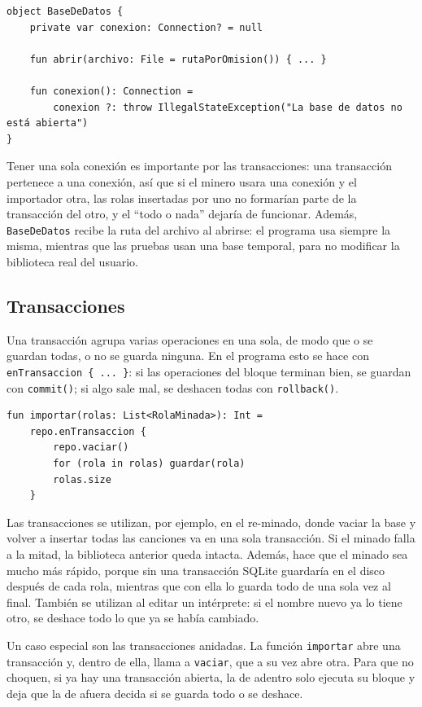 \documentclass[12pt,letterpaper]{article}
\begin{document}
\begin{verbatim}
object BaseDeDatos {
    private var conexion: Connection? = null

    fun abrir(archivo: File = rutaPorOmision()) { ... }

    fun conexion(): Connection =
        conexion ?: throw IllegalStateException("La base de datos no está abierta")
}
\end{verbatim}

Tener una sola conexión es importante por las transacciones: una
transacción pertenece a una conexión, así que si el minero usara una
conexión y el importador otra, las rolas insertadas por uno no formarían
parte de la transacción del otro, y el ``todo o nada'' dejaría de
funcionar. Además, \texttt{BaseDeDatos} recibe la ruta del archivo al
abrirse: el programa usa siempre la misma, mientras que las pruebas usan
una base temporal, para no modificar la biblioteca real del usuario.

\subsection{Transacciones}

Una transacción agrupa varias operaciones en una sola, de modo que o se
guardan todas, o no se guarda ninguna. En el programa esto se hace con
\texttt{enTransaccion \{ ... \}}: si las operaciones del bloque terminan
bien, se guardan con \texttt{commit()}; si algo sale mal, se deshacen
todas con \texttt{rollback()}.

\begin{verbatim}
fun importar(rolas: List<RolaMinada>): Int =
    repo.enTransaccion {
        repo.vaciar()
        for (rola in rolas) guardar(rola)
        rolas.size
    }
\end{verbatim}

Las transacciones se utilizan, por ejemplo, en el re-minado, donde vaciar
la base y volver a insertar todas las canciones va en una sola
transacción. Si el minado falla a la mitad, la biblioteca anterior queda
intacta. Además, hace que el minado sea mucho más rápido, porque sin una
transacción SQLite guardaría en el disco después de cada rola, mientras
que con ella lo guarda todo de una sola vez al final. También se utilizan
al editar un intérprete: si el nombre nuevo ya lo tiene otro, se deshace
todo lo que ya se había cambiado.

Un caso especial son las transacciones anidadas. La función
\texttt{importar} abre una transacción y, dentro de ella, llama a
\texttt{vaciar}, que a su vez abre otra. Para que no choquen, si ya hay
una transacción abierta, la de adentro solo ejecuta su bloque y deja que
la de afuera decida si se guarda todo o se deshace.
\end{document}
